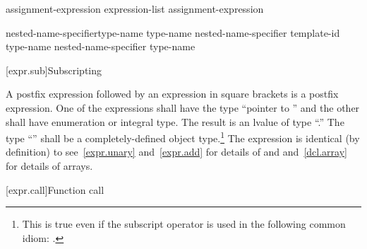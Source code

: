 \begin{bnf}
\br
    assignment-expression\br
    expression-list \terminal{,} assignment-expression
\end{bnf}


\begin{bnf}
\br
    \terminal{::}\opt nested-name-specifier\opt type-name \terminal{::\,\tilde} type-name\br
    \terminal{::}\opt nested-name-specifier  template-id \terminal{::\,\tilde} type-name\br
    \terminal{::}\opt nested-name-specifier\opt \terminal{\tilde} type-name
\end{bnf}

[expr.sub]{Subscripting}

\pnum
{}%
%
A postfix expression followed by an expression in square brackets is a
postfix expression. One of the expressions shall have the type ``pointer
to '' and the other shall have enumeration or integral type.
The result is an lvalue of type ``.''
%
The type ``'' shall be a completely-defined object type.\footnote{This
is true even if the subscript operator is used in the following common idiom:
.}
The expression  is identical (by definition) to
\enternote 
see~\ref{expr.unary} and~\ref{expr.add} for details of \tcode{*} and
\tcode{+} and~\ref{dcl.array} for details of arrays.
\exitnote 

[expr.call]{Function call}

